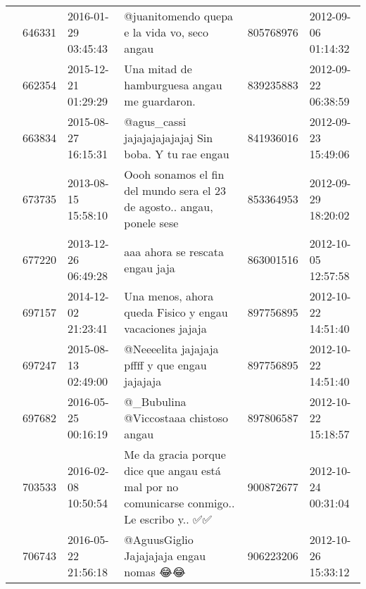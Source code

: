 \begin{tabular}{llllrl}
           & 646331  & 2016-01-29 03:45:43 &                                                                                                 @juanitomendo quepa e la vida vo, seco angau &   805768976 & 2012-09-06 01:14:32 \\
           & 662354  & 2015-12-21 01:29:29 &                                                                                                 Una mitad de hamburguesa angau me guardaron. &   839235883 & 2012-09-22 06:38:59 \\
           & 663834  & 2015-08-27 16:15:31 &                                                                                         @agus\_cassi jajajajajajajaj Sin boba. Y tu rae engau &   841936016 & 2012-09-23 15:49:06 \\
           & 673735  & 2013-08-15 15:58:10 &                                                                      Oooh sonamos el fin del mundo sera el 23 de agosto.. angau, ponele sese &   853364953 & 2012-09-29 18:20:02 \\
           & 677220  & 2013-12-26 06:49:28 &                                                                                                              aaa ahora se rescata engau jaja &   863001516 & 2012-10-05 12:57:58 \\
           & 697157  & 2014-12-02 21:23:41 &                                                                                      Una menos, ahora queda Fisico y engau vacaciones jajaja &   897756895 & 2012-10-22 14:51:40 \\
           & 697247  & 2015-08-13 02:49:00 &                                                                                               @Neeeelita jajajaja pffff y que engau jajajaja &   897756895 & 2012-10-22 14:51:40 \\
           & 697682  & 2016-05-25 00:16:19 &                                                                                                        @\_Bubulina @Viccostaaa chistoso angau &   897806587 & 2012-10-22 15:18:57 \\
           & 703533  & 2016-02-08 10:50:54 &                                                   Me da gracia porque dice que angau está mal por no comunicarse conmigo.. Le escribo y.. ✅✅ &   900872677 & 2012-10-24 00:31:04 \\
           & 706743  & 2016-05-22 21:56:18 &                                                                                                       @AguusGiglio Jajajajaja engau nomas 😂😂 &   906223206 & 2012-10-26 15:33:12 \\

\end{tabular}
